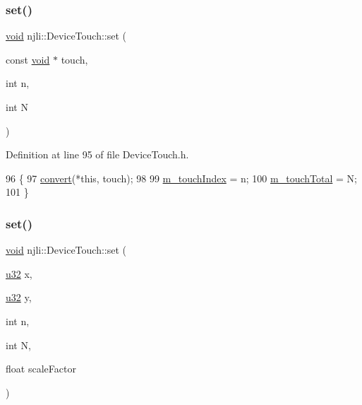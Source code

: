 \subsubsection{\texorpdfstring{set()}{set()}\hspace{0.1cm}{\footnotesize\ttfamily [1/4]}}
{\footnotesize\ttfamily \mbox{\hyperlink{_thread_8h_af1e856da2e658414cb2456cb6f7ebc66}{void}} njli\+::\+Device\+Touch\+::set (\begin{DoxyParamCaption}\item[{const \mbox{\hyperlink{_thread_8h_af1e856da2e658414cb2456cb6f7ebc66}{void}} $\ast$}]{touch,  }\item[{int}]{n,  }\item[{int}]{N }\end{DoxyParamCaption})\hspace{0.3cm}{\ttfamily [inline]}}



Definition at line 95 of file Device\+Touch.\+h.


\begin{DoxyCode}
96     \{
97       \mbox{\hyperlink{classnjli_1_1_device_touch_a2707fe5acb996fe22b1b20ceb6b1e063}{convert}}(*\textcolor{keyword}{this}, touch);
98 
99       \mbox{\hyperlink{classnjli_1_1_device_touch_a8702a0eb417f912b2b8733b2f21a8060}{m\_touchIndex}} = n;
100       \mbox{\hyperlink{classnjli_1_1_device_touch_ad36aeb2b221ff37cf29d6b5f837d0d93}{m\_touchTotal}} = N;
101     \}
\end{DoxyCode}
\mbox{\label{classnjli_1_1_device_touch_aab179cccc7d0c895455113d0706ae3b3}} 
\subsubsection{\texorpdfstring{set()}{set()}\hspace{0.1cm}{\footnotesize\ttfamily [2/4]}}
{\footnotesize\ttfamily \mbox{\hyperlink{_thread_8h_af1e856da2e658414cb2456cb6f7ebc66}{void}} njli\+::\+Device\+Touch\+::set (\begin{DoxyParamCaption}\item[{\mbox{\hyperlink{_util_8h_a10e94b422ef0c20dcdec20d31a1f5049}{u32}}}]{x,  }\item[{\mbox{\hyperlink{_util_8h_a10e94b422ef0c20dcdec20d31a1f5049}{u32}}}]{y,  }\item[{int}]{n,  }\item[{int}]{N,  }\item[{float}]{scale\+Factor }\end{DoxyParamCaption})\hspace{0.3cm}{\ttfamily [inline]}}



